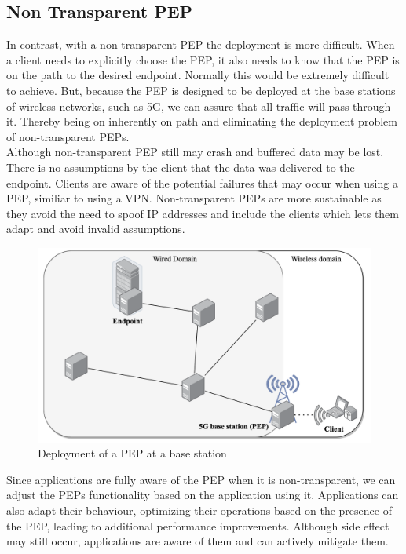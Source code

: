 \documentclass[a4paper,english, 11pt]{report}
\begin{document}
\subsection{Non Transparent PEP}
In contrast, with a non-transparent PEP the deployment is more difficult. When a client needs to explicitly choose the PEP, it also needs to know that the PEP is on the path to the desired endpoint. Normally this would be extremely difficult to achieve. But, because the PEP is designed to be deployed at the base stations of wireless networks, such as 5G, we can assure that all traffic will pass through it. Thereby being on inherently on path and eliminating the deployment problem of non-transparent PEPs.\\

Although non-transparent PEP still may crash and buffered data may be lost. There is no assumptions by the client that the data was delivered to the endpoint. Clients are aware of the potential failures that may occur when using a PEP, similiar to using a VPN. Non-transparent PEPs are more sustainable as they avoid the need to spoof IP addresses and include the clients which lets them adapt and avoid invalid assumptions.\\


\begin{figure} %
	\centering
	\includegraphics[scale=0.55]{../diagrams/drawio/deployment.png}
  	\caption{Deployment of a PEP at a base station}
  	\label{fig:pep_deployment}
\end{figure}


Since applications are fully aware of the PEP when it is non-transparent, we can adjust the PEPs functionality based on the application using it. Applications can also adapt their behaviour, optimizing their operations based on the presence of the PEP, leading to additional performance improvements. Although side effect may still occur, applications are aware of them and can actively mitigate them.\\
\end{document}
